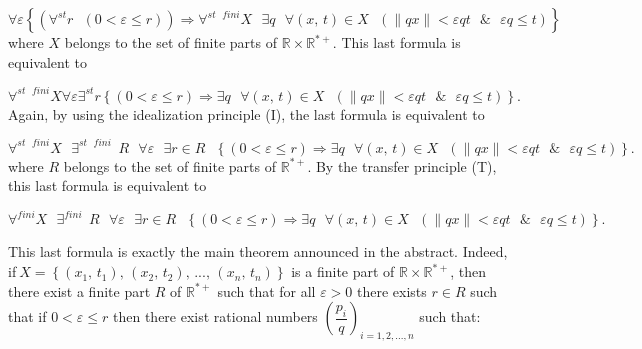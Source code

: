 \documentclass[12pt]{article}
\begin{document}
\begin{equation*}
\forall \varepsilon \left\{ \left( \forall ^{st}r\text{ }\left(
0<\varepsilon \leq r\right) \right) \Longrightarrow \forall ^{st\text{ }%
fini}X\text{ }\exists q\text{ }\forall \left( x\text{, }t\right) \in X\text{ 
}\left( \parallel qx\parallel <\varepsilon qt\text{ }\&\text{ }\varepsilon
q\leq t\right) \right\}
\end{equation*}%
where $X$ belongs to the set of finite parts of $\mathbb{R}\times \mathbb{R}%
^{\ast +}$. This last formula is equivalent to

\begin{equation*}
\forall ^{st\text{ }fini}X\forall \varepsilon \exists ^{st}r\left\{ \left(
0<\varepsilon \leq r\right) \Longrightarrow \exists q\text{ }\forall \left( x%
\text{, }t\right) \in X\text{ }\left( \parallel qx\parallel <\varepsilon qt%
\text{ }\&\text{ }\varepsilon q\leq t\right) \right\} \text{.}
\end{equation*}%
Again, by using the idealization principle (I), the last formula is
equivalent to

\begin{equation*}
\forall ^{st\text{ }fini}X\text{ }\exists ^{st\text{ }fini\text{ }}R\text{ }%
\forall \varepsilon \text{ }\exists r\in R\text{ }\left\{ \left(
0<\varepsilon \leq r\right) \Longrightarrow \exists q\text{ }\forall \left( x%
\text{, }t\right) \in X\text{ }\left( \parallel qx\parallel <\varepsilon qt%
\text{ }\&\text{ }\varepsilon q\leq t\right) \right\} \text{.}
\end{equation*}%
where $R$ belongs to the set of finite parts of $\mathbb{R}^{\ast +}$. By
the transfer principle (T), this last formula is equivalent to

\begin{equation*}
\forall ^{fini}X\text{ }\exists ^{fini\text{ }}R\text{ }\forall \varepsilon 
\text{ }\exists r\in R\text{ }\left\{ \left( 0<\varepsilon \leq r\right)
\Longrightarrow \exists q\text{ }\forall \left( x\text{, }t\right) \in X%
\text{ }\left( \parallel qx\parallel <\varepsilon qt\text{ }\&\text{ }%
\varepsilon q\leq t\right) \right\} \text{.}
\end{equation*}

This last formula is exactly the main theorem announced in the abstract.
Indeed, if$\ X=\left\{ \left( x_{1}\text{, }t_{1}\right) \text{, }\left(
x_{2}\text{, }t_{2}\right) \text{, ..., }\left( x_{n}\text{, }t_{n}\right)
\right\} $ is a finite part of $\mathbb{R}\times \mathbb{R}^{\ast +}$, then
there exist a finite part $R$ of $\mathbb{R}^{\ast +}$ such that for all $%
\varepsilon >0$ there exists $r\in R$ such that if $0<\varepsilon \leq r$
then there exist rational numbers $\left( \dfrac{p_{i}}{q}\right)
_{i=1,2,...,n}$ such that:
\end{document}
